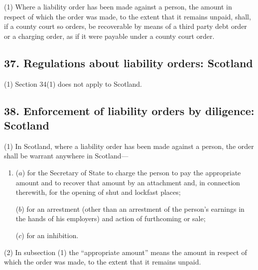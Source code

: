 \documentclass[12pt,a4paper]{article}
\begin{document}
(1) Where a liability order has been made against a person, the amount in respect of which the order was made, to the extent that it remains unpaid, shall, if a county court so orders, be recoverable by means of a third party debt order or a charging order, as if it were payable under a county court order.


\subsection{37. Regulations about liability orders: Scotland}

(1) Section 34(1) does not apply to Scotland.


\subsection{38. Enforcement of liability orders by diligence: Scotland}

(1) In Scotland, where a liability order has been made against a person, the order shall be warrant anywhere in Scotland---
\begin{enumerate}\item[]
($a$) for the Secretary of State to charge the person to pay the appropriate amount and to recover that amount by an attachment and, in connection therewith, for the opening of shut and lockfast places;

($b$) for an arrestment (other than an arrestment of the person’s earnings in the hands of his employers) and action of furthcoming or sale;

($c$) for an inhibition.
\end{enumerate}

(2) In subsection (1) the “appropriate amount” means the amount in respect of which the order was made, to the extent that it remains unpaid.
\end{document}
